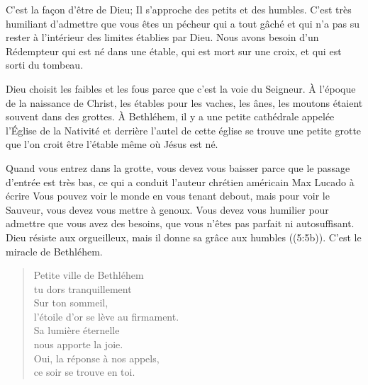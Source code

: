 C'est la façon d'être de Dieu; Il s'approche des petits et des humbles. C'est très humiliant d'admettre que vous êtes un pécheur qui a tout gâché et qui n'a pas su rester à l'intérieur des limites établies par Dieu. Nous avons besoin d'un Rédempteur qui est né dans une étable, qui est mort sur une croix, et qui est sorti du tombeau.

Dieu choisit les faibles et les fous parce que c'est la voie du Seigneur. À l'époque de la naissance de Christ, les étables pour les vaches, les ânes, les moutons étaient souvent dans des grottes. À Bethléhem, il y a une petite cathédrale appelée l'Église de la Nativité et derrière l'autel de cette église se trouve une petite grotte que l'on croit être l'étable même où Jésus est né.

Quand vous entrez dans la grotte, vous devez vous baisser parce que le passage d'entrée est très bas, ce qui a conduit l'auteur chrétien américain Max Lucado à écrire\frcolon{} \Og Vous pouvez voir le monde en vous tenant debout, mais pour voir le Sauveur, vous devez vous mettre à genoux. Vous devez vous humilier pour admettre que vous avez des besoins, que vous n'êtes pas parfait ni autosuffisant. \Fg{} \Og Dieu résiste aux orgueilleux, mais il donne sa grâce aux humbles \Fg{} ((5:5b)). C'est le miracle de Bethléhem.

\begin{dvquotes}


\ornrule
\begin{verse}
\begin{altverse}
Petite ville de Bethléhem\\
tu dors tranquillement\\
Sur ton sommeil,\\
l'étoile d'or se lève au firmament.\\
Sa lumière éternelle\\
nous apporte la joie.\\
Oui, la réponse à nos appels,\\
ce soir se trouve en toi.
\end{altverse}
\end{verse}
\end{dvquotes}
